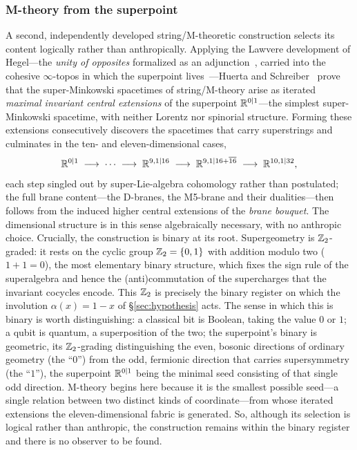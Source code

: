 \subsubsection{M-theory from the superpoint}\label{sssec:superpoint}
A second, independently developed string/M-theoretic construction selects its content logically rather than anthropically. Applying the Lawvere development of
Hegel---the \emph{unity of opposites} formalized as an adjunction~\cite{lawvere96unity}, carried
into the cohesive $\infty$-topos in which the superpoint lives~\cite{Schreiber13cohesive}---Huerta and
Schreiber~\cite{huerta2018m} prove that the super-Minkowski spacetimes of string/M-theory arise as iterated
\emph{maximal invariant central extensions} of the superpoint $\mathbb{R}^{0|1}$---the simplest super-Minkowski spacetime,
with neither Lorentz nor spinorial structure. Forming these extensions consecutively discovers the spacetimes that
carry superstrings and culminates in the ten- and eleven-dimensional cases,
\begin{equation}
\mathbb{R}^{0|1}\;\longrightarrow\;\cdots\;\longrightarrow\;\mathbb{R}^{9,1|16}\;\longrightarrow\;
\mathbb{R}^{9,1|16+\overline{16}}\;\longrightarrow\;\mathbb{R}^{10,1|32},
\end{equation}
each step singled out by super-Lie-algebra cohomology rather than postulated; the full brane content---the
D-branes, the M5-brane and their dualities---then follows from the induced higher central extensions of the
\emph{brane bouquet}. The dimensional structure is in this sense algebraically necessary, with no anthropic choice.
Crucially, the construction is binary at its root. Supergeometry is $\mathbb{Z}_2$-graded: it rests on the cyclic group
$\mathbb{Z}_2=\{0,1\}$ with addition modulo two ($1+1=0$), the most elementary binary structure, which fixes the sign rule
of the superalgebra and hence the (anti)commutation of the supercharges that the invariant cocycles encode. This
$\mathbb{Z}_2$ is precisely the binary register on which the involution $\alpha(x)=1-x$ of \S\ref{sec:hypothesis} acts. The
sense in which this is binary is worth distinguishing: a classical bit is Boolean, taking the value $0$ or $1$; a
qubit is quantum, a superposition of the two; the superpoint's binary is geometric, its $\mathbb{Z}_2$-grading
distinguishing the even, bosonic directions of ordinary geometry (the ``$0$'') from the odd, fermionic direction
that carries supersymmetry (the ``$1$''), the superpoint $\mathbb{R}^{0|1}$ being the minimal seed consisting of that single
odd direction. M-theory begins here because it is the smallest possible seed---a single relation between two
distinct kinds of coordinate---from whose iterated extensions the eleven-dimensional fabric is generated. So,
although its selection is logical rather than anthropic, the construction remains within the binary register and
there is no observer to be found.

